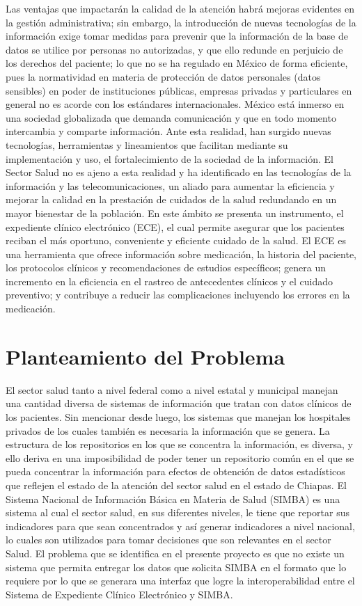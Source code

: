 Las ventajas que impactarán la calidad de la atención habrá mejoras evidentes en la gestión administrativa; sin embargo, la introducción de nuevas tecnologías de la información exige tomar medidas para prevenir que la información de la base de datos se utilice por personas no autorizadas, y que ello redunde en perjuicio de los derechos del paciente; lo que no se ha regulado en México de forma eficiente, pues la normatividad en materia de protección de datos personales (datos sensibles) en poder de instituciones públicas, empresas privadas y particulares en general no es acorde con los estándares internacionales. México está inmerso en una sociedad globalizada que demanda comunicación y que en todo momento intercambia y comparte información. Ante esta realidad, han surgido nuevas tecnologías, herramientas y lineamientos que facilitan mediante su implementación y uso, el fortalecimiento de la sociedad de la información. El Sector Salud no es ajeno a esta realidad y ha identificado en las tecnologías de la información y las telecomunicaciones, un aliado para aumentar la eficiencia y mejorar la calidad en la prestación de cuidados de la salud redundando en un mayor bienestar de la población. En este ámbito se presenta un instrumento, el expediente clínico electrónico (ECE), el cual permite asegurar que los pacientes reciban el más oportuno, conveniente y eficiente cuidado de la salud. El ECE es una herramienta que ofrece información sobre medicación, la historia del paciente, los protocolos clínicos y recomendaciones de estudios específicos; genera un incremento en la eficiencia en el rastreo de antecedentes clínicos y el cuidado preventivo; y contribuye a reducir las complicaciones incluyendo los errores en la medicación.


\section{Planteamiento del Problema}
El sector salud tanto a nivel federal como a nivel estatal y municipal manejan una cantidad diversa de sistemas de información que tratan con datos clínicos de los pacientes. Sin mencionar desde luego, los sistemas que manejan los hospitales privados de los cuales también es necesaria la información que se genera. La estructura de los repositorios en los que se concentra la información, es diversa, y ello deriva en una imposibilidad de poder tener un repositorio común en el que se pueda concentrar la información para efectos de obtención de datos estadísticos que reflejen el estado de la atención del sector salud en el estado de Chiapas.  El Sistema Nacional de Información Básica en Materia de Salud (SIMBA)  es una sistema al cual el sector salud, en sus diferentes niveles, le tiene que reportar sus indicadores para que sean concentrados y así generar indicadores a nivel nacional, lo cuales son utilizados para tomar decisiones que son relevantes en el sector Salud. El problema que se identifica en el presente proyecto es que no existe un sistema que permita entregar los datos que solicita SIMBA en el formato que lo requiere por lo que se generara una interfaz que logre la interoperabilidad entre el Sistema de Expediente Clínico Electrónico y SIMBA.
 
